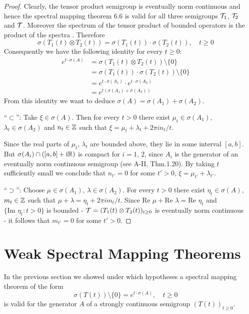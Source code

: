 \begin{proof}
Clearly, the tensor product semigroup is eventually norm continuous and hence the spectral mapping theorem 6.6 is valid for all three semigroups $\mathcal{T}_{1}$, $\mathcal{T}_{2}$ and $\mathcal{T}$.
Moreover the spectrum of the tensor product of bounded operators is the product of the spectra \citet[XIII.9]{reedsimon:1978}.
Therefore
\[
	\sigma(T_{1}(t)\otimes T_{2}(t)) = \sigma(T_{1}(t))\cdot\sigma(T_{2}(t)), \quad t \geq 0
\]
Consequently we have the following identity for every $t \geq 0$:
\begin{align*}
e^{t\cdot\sigma(A)} &= \sigma(T_{1}(t)\otimes T_{2}(t)) \setminus \{0\} \\
&= \sigma(T_{1}(t))\cdot\sigma(T_{2}(t)) \setminus \{0\} \\
&= e^{t\cdot\sigma(A_{1})}\cdot e^{t\cdot\sigma(A_{2})} \\
&= e^{t(\sigma(A_{1})+\sigma(A_{2}))}
\end{align*}
From this identity we want to deduce $\sigma(A) = \sigma(A_{1}) + \sigma(A_{2})$.

\enquote{$\subset$}: Take $\xi \in \sigma(A)$.
Then for every $t > 0$ there exist $\mu_{t} \in \sigma(A_{1})$, $\lambda_{t} \in \sigma(A_{2})$ and $n_{t} \in \mathbb{Z}$ such that $\xi = \mu_{t} + \lambda_{t} + 2\pi i n_{t}/t$.

Since the real parts of $\mu_{t}$, $\lambda_{t}$ are bounded above, they lie in some interval $[a,b]$.
But $\sigma(A_{i}) \cap ([a,b] + \mathrm{i}\mathbb{R})$ is compact for $i = 1$, $2$, since $A_{i}$ is the generator of an eventually norm continuous semigroup (see A-II, Thm.1.20).
By taking $t$ sufficiently small we conclude that $n_{t'} = 0$ for some $t' > 0$, \ie $\xi = \mu_{t'} + \lambda_{t'}$.

\enquote{$\supset$}: Choose $\mu \in \sigma(A_{1})$, $\lambda \in \sigma(A_{2})$.
For every $t > 0$ there exist $\eta_{t} \in \sigma(A)$, $m_{t} \in \mathbb{Z}$ such that $\mu + \lambda = \eta_{t} + 2\pi i m_{t}/t$.
Since $\text{Re }\mu + \text{Re }\lambda = \text{Re }\eta_{t}$ and $\{\text{Im }\eta_{t}: t > 0\}$ is bounded - $\mathcal{T} = (T_{1}(t) \otimes T_{2}(t))_{t\geq 0}$ is eventually norm continuous - it follows that $m_{t'} = 0$ for some $t' > 0$.
\end{proof}
\section{Weak Spectral Mapping Theorems}\label{sec:a3-7}
In the previous section we showed under which hypotheses a spectral mapping theorem of the form
\begin{equation}\label{eq:a3-7.1}
\sigma(T(t)) \setminus \{0\} = e^{t \cdot \sigma(A)}, \quad t \geq 0
\end{equation}
is valid for the generator $A$ of a strongly continuous semigroup $(T(t))_{t\geq 0}$.


